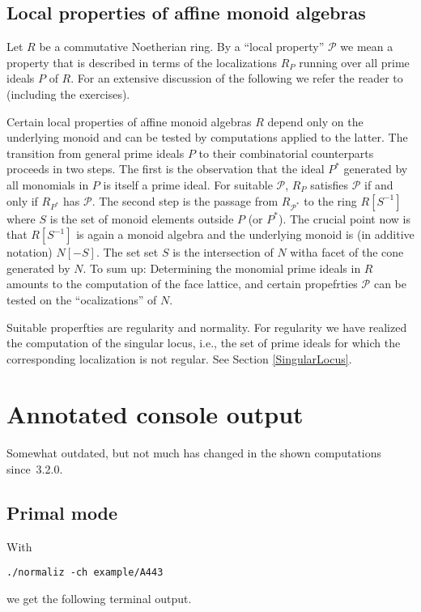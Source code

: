 \subsection{Local properties of affine monoid algebras}
\def\cP{{\mathcal P}}
Let $R$ be a commutative Noetherian ring. By a ``local property'' $\cP$  we mean a property that is described in terms of the localizations $R_P$ running over all prime ideals $P$ of $R$. For an extensive discussion of the following we refer the reader to \cite[Chap. 4]{BG} (including the exercises).

Certain local properties of affine monoid algebras $R$ depend only on the underlying monoid and can be tested by computations applied to the latter. The transition from general prime ideals $P$ to their combinatorial counterparts proceeds in two steps. The first is the observation that the ideal $P^*$ generated by all monomials in $P$ is itself a prime ideal. For suitable $\cP$, $R_P$ satisfies $\cP$ if and only if $R_{P^*}$ has $\cP$. The second step is the passage from $R_{\cP^*}$ to the ring $R[S^{-1}]$ where $S$ is the set of monoid elements outside $P$ (or $P^*$). The crucial point now is that $R[S^{-1}]$ is again a monoid algebra and the underlying monoid is (in additive notation) $N[-S]$. The set set $S$ is the intersection of $N$ witha facet of the  cone generated by $N$. To sum up: Determining the monomial prime ideals in $R$ amounts to the computation of the face lattice, and certain propefrties $\cP$ can be tested on the ``ocalizations'' of $N$. 

Suitable properfties are regularity and normality. For regularity we  have realized the computation of the singular locus, i.e., the set of prime ideals for which the corresponding localization is not regular. See Section \ref{SingularLocus}.

\newpage

\section{Annotated console output}\label{Console}

Somewhat outdated, but not much has changed in the shown computations since~3.2.0.

\subsection{Primal mode}

With
\begin{Verbatim}
./normaliz -ch example/A443
\end{Verbatim}
we get the following terminal output.

